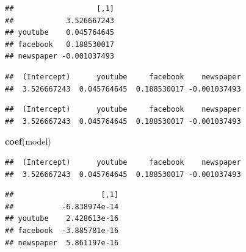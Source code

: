 \documentclass[]{article}
\newenvironment{Shaded}{\begin{snugshade}}{\end{snugshade}}
\newcommand{\KeywordTok}[1]{\textcolor[rgb]{0.13,0.29,0.53}{\textbf{#1}}}
\newcommand{\DecValTok}[1]{\textcolor[rgb]{0.00,0.00,0.81}{#1}}
\newcommand{\OperatorTok}[1]{\textcolor[rgb]{0.81,0.36,0.00}{\textbf{#1}}}
\newcommand{\NormalTok}[1]{#1}
\begin{document}
\begin{verbatim}
##                   [,1]
##            3.526667243
## youtube    0.045764645
## facebook   0.188530017
## newspaper -0.001037493
\end{verbatim}

\begin{Shaded}
\end{Shaded}

\begin{verbatim}
##  (Intercept)      youtube     facebook    newspaper 
##  3.526667243  0.045764645  0.188530017 -0.001037493
\end{verbatim}

\begin{Shaded}
\end{Shaded}

\begin{verbatim}
##  (Intercept)      youtube     facebook    newspaper 
##  3.526667243  0.045764645  0.188530017 -0.001037493
\end{verbatim}

\begin{Shaded}
\begin{Highlighting}[]
\KeywordTok{coef}\NormalTok{(model)}
\end{Highlighting}
\end{Shaded}

\begin{verbatim}
##  (Intercept)      youtube     facebook    newspaper 
##  3.526667243  0.045764645  0.188530017 -0.001037493
\end{verbatim}

\begin{Shaded}
\end{Shaded}

\begin{verbatim}
##                    [,1]
##           -6.838974e-14
## youtube    2.428613e-16
## facebook  -3.885781e-16
## newspaper  5.861197e-16
\end{verbatim}
\end{document}
